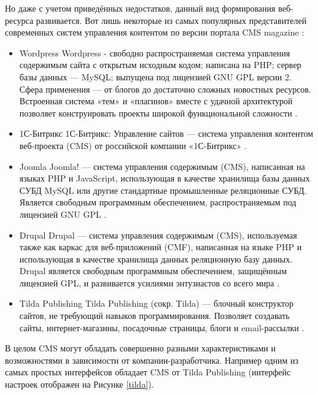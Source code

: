     Но даже с учетом приведённых недостатков, данный вид формирования веб-ресурса развивается.
    Вот лишь некоторые из самых популярных представителей современных систем управления контентом по версии портала CMS magazine \cite{cmsmagazine}:
    \begin{itemize}
        \item Wordpress
        Wordpress - свободно распространяемая система управления содержимым сайта с открытым исходным кодом; написана на PHP; сервер базы данных — MySQL; выпущена под лицензией GNU GPL версии 2.
        Сфера применения — от блогов до достаточно сложных новостных ресурсов.
        Встроенная система «тем» и «плагинов» вместе с удачной архитектурой позволяет конструировать проекты широкой функциональной сложности \cite{wiki-WordPress}.

        \item 1С-Битрикс
        1С-Битрикс: Управление сайтов — система управления контентом веб-проекта (CMS) от российской компании «1С-Битрикс» \cite{wiki-1cb}.

        \item Joomla
        Joomla! — система управления содержимым (CMS), написанная на языках PHP и JavaScript, использующая в качестве хранилища базы данных СУБД MySQL или другие стандартные промышленные реляционные СУБД.
        Является свободным программным обеспечением, распространяемым под лицензией GNU GPL \cite{wiki-joomla}.

        \item Drupal
        Drupal — система управления содержимым (CMS), используемая также как каркас для веб-приложений (CMF), написанная на языке PHP и использующая в качестве хранилища данных реляционную базу данных.
        Drupal является свободным программным обеспечением, защищённым лицензией GPL, и развивается усилиями энтузиастов со всего мира \cite{wiki-drupal}.

        \item Tilda Publishing
        Tilda Publishing (сокр. Tilda) — блочный конструктор сайтов, не требующий навыков программирования.
        Позволяет создавать сайты, интернет-магазины, посадочные страницы, блоги и email-рассылки \cite{wiki-tilda}.
    \end{itemize}

    В целом CMS могут обладать совершенно разными характеристиками и возможностями в зависимости от компании-разработчика. Например одним из самых простых интерфейсов обладает CMS от Tilda Publishing (интерфейс настроек отображен на Рисунке \ref{tilda}).

